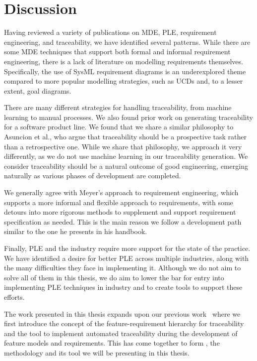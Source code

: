 \section{Discussion}

Having reviewed a variety of publications on \gls{MDE}, \gls{PLE}, requirement engineering, and traceability, we have identified several patterns. While there are some \gls{MDE} techniques that support both formal and informal requirement engineering, there is a lack of literature on modelling requirements themselves. Specifically, the use of SysML requirement diagrams is an underexplored theme compared to more popular modelling strategies, such as \gls{UCD}s and, to a lesser extent, goal diagrams. 

There are many different strategies for handling traceability, from machine learning to manual processes. We also found prior work on generating traceability for a software product line. We found that we share a similar philosophy to Asuncion et al., who argue that traceability should be a prospective task rather than a retrospective one. While we share that philosophy, we approach it very differently, as we do not use machine learning in our traceability generation. We consider traceability should be a natural outcome of good engineering, emerging naturally as various phases of development are completed.

We generally agree with Meyer's approach to requirement engineering, which supports a more informal and flexible approach to requirements, with some detours into more rigorous methods to supplement and support requirement specification as needed. This is the main reason we follow a development path similar to the one he presents in his handbook.

Finally, \gls{PLE} and the industry require more support for the state of the practice. We have identified a desire for better \gls{PLE} across multiple industries, along with the many difficulties they face in implementing it. Although we do not aim to solve all of them in this thesis, we do aim to lower the bar for entry into implementing \gls{PLE} techniques in industry and to create tools to support these efforts.

The work presented in this thesis expands upon our previous work~\cite{10.1145/3652620.3687816, 10.1145/3652620.3688349} where we first introduce the concept of the feature-requirement hierarchy for traceability and the tool to implement automated traceability during the development of feature models and requirements. This has come together to form \tool, the methodology and its tool we will be presenting in this thesis. 

%
%
%
